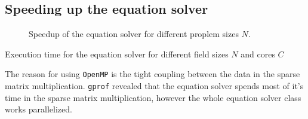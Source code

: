 \documentclass[12pt]{article}
\begin{document}
\subsection{Speeding up the equation solver}

\begin{figure}[p]
    \centering
    
    \caption{Speedup of the equation solver for different proplem sizes $N$.}
    \label{fig:SpeedupSimulation}
\end{figure}

\begin{table}[p]
    \centering
    
    \caption{Execution time for the equation solver for different field sizes $N$ and cores $C$}
    \label{tab:SpeedupSimulation}
\end{table}

The reason for using \texttt{OpenMP} is the tight coupling between the data in the sparse matrix multiplication. \texttt{gprof} revealed that the equation solver spends most of it's time in the sparse matrix multiplication, however the whole equation solver class works parallelized.
\end{document}
